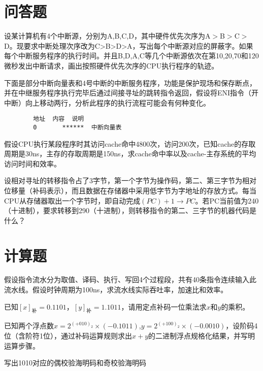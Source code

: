 \documentclass[a4paper]{exam}
\begin{document}
\section{问答题}
\begin{questions}
	\question 设某计算机有4个中断源，分别为A,B,C,D，其中硬件优先次序为A$>$B$>$C$>$D。现要求中断处理次序改为C>B>D>A，写出每个中断源对应的屏蔽字。如果每个中断服务程序的执行时间。并且B,D,A,C等几个中断源依次在第10,20,70和120微秒发出中断请求，画出按照硬件优先次序的CPU执行程序的轨迹。

	\vspace{2cm}
	\question 下面是部分中断向量表和4号中断的中断服务程序，功能是保护现场和保存断点，并在中继服务程序执行完毕后通过间接寻址的跳转指令返回，假设将ENI指令（开中断）向上移动两行，分析此程序的执行流程可能会有何种变化。

	\begin{verbatim}
		地址	内容	说明
		0       ******  中断向量表
	\end{verbatim}

	\vspace{3cm}

	\question 假设CPU执行某段程序时其访问cache命中4800次，访问200次，已知cache的存取周期是30ns，主存的存取周期是150ns，求cache命中率以及cache-主存系统的平均访问时间和效率。

	\vspace{3cm}

	\question 设相对寻址的转移指令占了3字节，第一个字节为操作码，第二、第三字节为相对位移量（补码表示），而且数据在存储器中采用低字节为字地址的存放方式。每当CPU从存储器取出一个字节时，即自动完成$\left( {PC} \right) + 1 \to PC$。若PC当前值为240（十进制），要求转移到290（十进制），则转移指令的第二、三字节的机器代码是什么？
	\vspace{4cm}
\end{questions}

\section{计算题}
\begin{questions}
	\question 假设指令流水分为取值、译码、执行、写回4个过程段，共有40条指令连续输入此流水线。假设时钟周期为100ns，求流水线实际吞吐率，加速比和效率。
	\vspace{3cm}

	\question 已知${\left[ x \right]_{\mbox{补}}}=0.1101$，${\left[ y \right]_{\mbox{补}}} =1.1011$，请用定点补码一位乘法求$x$和$y$的乘积。

	\vspace{3cm}

	\question 已知两个浮点数$x = {2^{{{( + 010)}_2}}} \times ( - 0.1011)$,$y = {2^{{{( + 100)}_2}}} \times ( - 0.0010)$，设阶码4位（含阶符1位），通过补码运算规则求出$x+y$的二进制浮点规格化结果，并写明运算步骤。\
	\vspace{4cm}

	\question 写出1010对应的偶校验海明码和奇校验海明码

	\vspace{3cm}
\end{questions}
\end{document}
